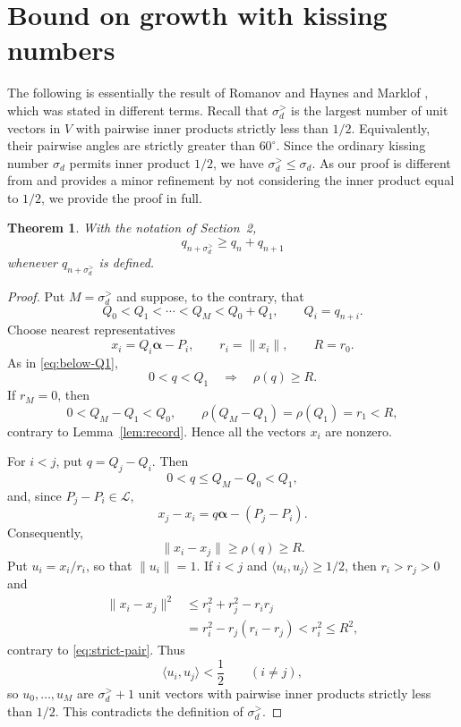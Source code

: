 \documentclass[11pt,reqno]{amsart}
\newtheorem{theorem}{Theorem}[section]
\theoremstyle{definition}
\newcommand{\0}{\mbf 0}%
\newcommand{\cL}{\mathcal L}
\newcommand{\balpha}{\boldsymbol{\alpha}}
\begin{document}
\section{Bound on growth with kissing numbers}

The following is essentially the result of Romanov \cite{Romanov2006} and Haynes and Marklof \cite[Propositions~18--19]{HaynesMarklof2022}, which was stated in different terms. Recall that $\sigma_d^{>}$ is the largest
number of unit vectors in $V$ with
pairwise inner products strictly less than $1/2$. Equivalently, their pairwise
angles are strictly greater than $60^\circ$. Since the ordinary kissing number
$\sigma_d$ permits inner product $1/2$, we have
$\sigma_d^{>}\le\sigma_d$. As our proof is different from \cite{Romanov2006} and provides a minor refinement by not considering the inner product equal to $1/2$, we provide the proof in full.

\begin{theorem}\label{thm:strict-growth}
With the notation of Section~2,
$$
 q_{n+\sigma_d^{>}}\ge q_n+q_{n+1}
$$
whenever $q_{n+\sigma_d^{>}}$ is defined.
\end{theorem}

\begin{proof}
Put $M=\sigma_d^{>}$ and suppose, to the contrary, that
$$
 Q_0<Q_1<\cdots<Q_M<Q_0+Q_1,
 \qquad Q_i=q_{n+i}.
$$
Choose nearest representatives
$$
 x_i=Q_i\balpha-P_i,
 \qquad r_i=\|x_i\|,
 \qquad R=r_0.
$$
As in \eqref{eq:below-Q1},
\begin{equation}\label{eq:angular-threshold}
 0<q<Q_1\quad\Longrightarrow\quad \rho(q)\ge R.
\end{equation}
If $r_M=0$, then
$$
 0<Q_M-Q_1<Q_0,\qquad
 \rho(Q_M-Q_1)=\rho(Q_1)=r_1<R,
$$
contrary to Lemma~\ref{lem:record}. Hence all the vectors $x_i$ are nonzero.

For $i<j$, put $q=Q_j-Q_i$. Then
$$
 0<q\le Q_M-Q_0<Q_1,
$$
and, since $P_j-P_i\in\cL$,
$$
 x_j-x_i=q\balpha-(P_j-P_i).
$$
Consequently,
\begin{equation}\label{eq:strict-pair}
 \|x_i-x_j\|\ge\rho(q)\ge R.
\end{equation}
Put $u_i=x_i/r_i$, so that $\|u_i\|=1$. If $i<j$ and
$\langle u_i,u_j\rangle\ge1/2$, then $r_i>r_j>0$ and
$$
 \begin{aligned}
 \|x_i-x_j\|^2
 &\le r_i^2+r_j^2-r_i r_j\\
 &=r_i^2-r_j(r_i-r_j)
 <r_i^2\le R^2,
 \end{aligned}
$$
contrary to \eqref{eq:strict-pair}. Thus
$$
 \langle u_i,u_j\rangle<\frac12
 \qquad(i\ne j),
$$
so $u_0,\ldots,u_M$ are $\sigma_d^{>}+1$ unit vectors with pairwise inner
products strictly less than $1/2$. This contradicts the definition of
$\sigma_d^{>}$.
\end{proof}
\end{document}
